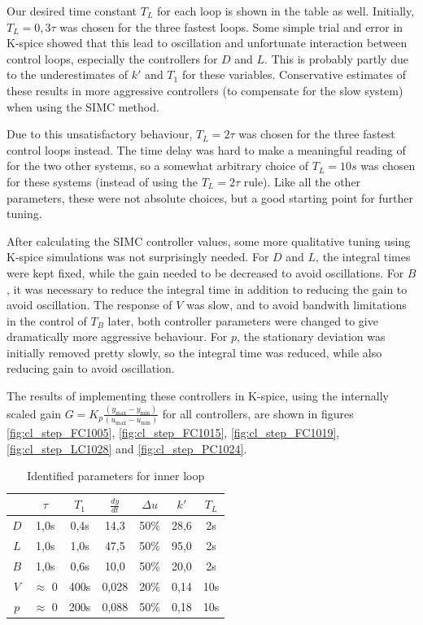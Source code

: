 \documentclass[12pt]{article}
\begin{document}
Our desired time constant $T_L$ for each loop is shown in the table as well. Initially, $T_L = 0,3\tau$ was chosen for the three fastest loops. Some simple trial and error in K-spice showed that this lead to oscillation and unfortunate interaction between control loops, especially the controllers for $D$ and $L$. This is probably partly due to the underestimates of $k'$ and $T_1$ for these variables. Conservative estimates of these results in more aggressive controllers (to compensate for the slow system) when using the SIMC method.

Due to this unsatisfactory behaviour, $T_L = 2\tau$ was chosen for the three fastest control loops instead. The time delay was hard to make a meaningful reading of for the two other systems, so a somewhat arbitrary choice of $T_L = 10s$ was chosen for these systems (instead of using the $T_L = 2\tau$ rule). Like all the other parameters, these were not absolute choices, but a good starting point for further tuning.

After calculating the SIMC controller values, some more qualitative tuning using K-spice simulations was not surprisingly needed. For $D$ and $L$, the integral times were kept fixed, while the gain needed to be decreased to avoid oscillations. For $B$, it was necessary to reduce the integral time in addition to reducing the gain to avoid oscillation. The response of $V$ was slow, and to avoid bandwith limitations in the control of $T_B$ later, both controller parameters were changed to give dramatically more aggressive behaviour. For $p$, the stationary deviation was initially removed pretty slowly, so the integral time was reduced, while also reducing gain to avoid oscillation.

The results of implementing these controllers in K-spice, using the internally scaled gain $G = K_p \frac{(y_{\max} - y_{\min})}{(u_{\max} - u_{\min})}$ for all controllers, are shown in figures \ref{fig:cl_step_FC1005}, \ref{fig:cl_step_FC1015}, \ref{fig:cl_step_FC1019}, \ref{fig:cl_step_LC1028} and \ref{fig:cl_step_PC1024}.

\begin{table}
\centering
\begin{tabular}{c | c | c | c | c | c || c}
& $\tau$ & $T_1$ & $\frac{dy}{dt}$ & $\Delta u$ & $k'$ & $T_L$ \\ \hline
$D$ & 1,0s & 0,4s & 14,3 & 50\% & 28,6 & 2s \\
$L$ & 1,0s & 1,0s & 47,5 & 50\% & 95,0 & 2s \\
$B$ & 1,0s & 0,6s & 10,0 & 50\% & 20,0 & 2s \\
$V$ & $\approx$ 0 & 400s & 0,028 & 20\% & 0,14 & 10s \\
$p$ & $\approx$ 0 & 200s & 0,088 & 50\% & 0,18 & 10s
\end{tabular}
\caption{Identified parameters for inner loop}
\label{tab:inner_loop_step_responses}
\end{table}
\end{document}
